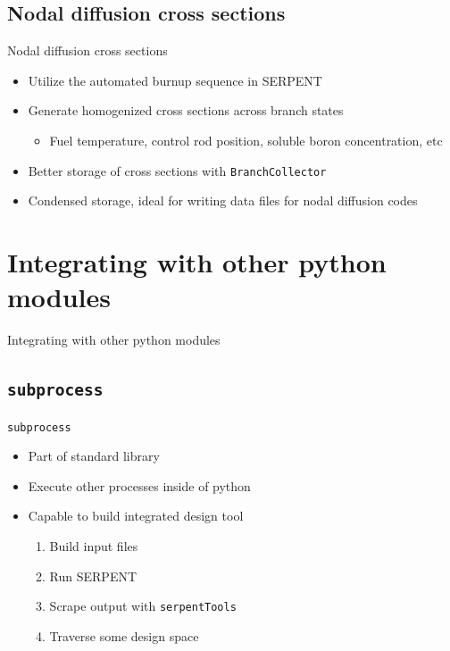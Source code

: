 \documentclass{beamer}
\newcommand{\st}{\texttt{serpentTools} }
\begin{document}
\subsection{Nodal diffusion cross sections}

\begin{frame}{Nodal diffusion cross sections}
    \begin{itemize}
        \item{Utilize the automated burnup sequence in SERPENT}
        \item{Generate homogenized cross sections across branch states}
        \begin{itemize}
            \item{Fuel temperature, control rod position, soluble boron concentration, etc}
        \end{itemize}
    \item{Better storage of cross sections with \texttt{BranchCollector}}
    \item{Condensed storage, ideal for writing data files for nodal diffusion codes}
    \end{itemize}
\end{frame}

\section{Integrating with other python modules}

\begin{frame}{Integrating with other python modules}
        \tableofcontents[sectionstyle=show/hide,subsectionstyle=show/show/hide]
\end{frame}

\subsection{\texttt{subprocess}}

\begin{frame}{\texttt{subprocess}}
    \begin{itemize}
        \item{Part of standard library}
        \item{Execute other processes inside of python}
        \item{Capable to build integrated design tool}
        \begin{enumerate}
            \item{Build input files}
            \item{Run SERPENT}
            \item{Scrape output with \st}
            \item{Traverse some design space}
        \end{enumerate}
    \end{itemize}
\end{frame}
\end{document}
